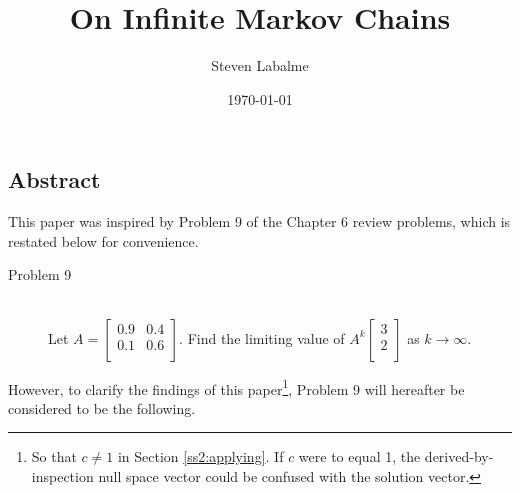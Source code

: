 \documentclass[titlepage]{article}
\title{On Infinite Markov Chains}
\author{Steven Labalme}
\date{\today}
\begin{document}
\maketitle



\tableofcontents
\listoffigures
\newpage



\pagestyle{fancy}
\fancyhf{}
\renewcommand{\headrulewidth}{0pt}
\begin{center}
    \setcounter{secnumdepth}{0}
    \section{Abstract}
    \setcounter{secnumdepth}{3}
\end{center}
This paper was inspired by Problem 9 of the Chapter 6 review problems, which is restated below for convenience.
\vspace{8pt}

\begin{probint}
    \begin{description}
        \item[Problem 9] \hfill \\ Let $
            A =
            \begin{bmatrix}
                0.9 & 0.4\\
                0.1 & 0.6\\
            \end{bmatrix}
        $. Find the limiting value of $
            A^k
            \begin{bmatrix}
                3\\
                2\\
            \end{bmatrix}
        $ as $k\to\infty$.
    \end{description}
\end{probint}

However, to clarify the findings of this paper\footnote{So that $c\neq 1$ in Section \ref{ss2:applying}. If $c$ were to equal 1, the derived-by-inspection null space vector could be confused with the solution vector.}, Problem 9 will hereafter be considered to be the following.
\end{document}
